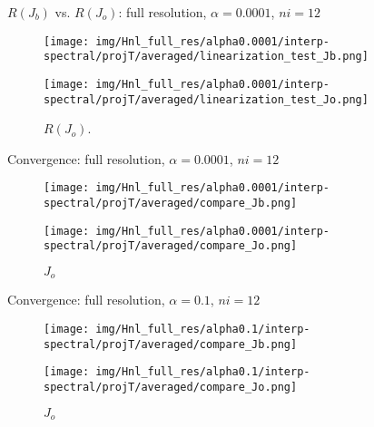 \documentclass[francais]{beamer}
\begin{document}
\begin{frame}{$R(J_b)$ vs. $R(J_o)$: full resolution, $\alpha = 0.0001$, $ni=12$}
\begin{center}
\begin{figure}
  \texttt{[image: img/Hnl\_full\_res/alpha0.0001/interp-spectral/projT/averaged/linearization\_test\_Jb.png]}
  \caption{$R(J_b)$.}
\endminipage\hfill
{}
  \texttt{[image: img/Hnl\_full\_res/alpha0.0001/interp-spectral/projT/averaged/linearization\_test\_Jo.png]}
  \caption{$R(J_o)$.}
\endminipage
\end{figure}
\end{center}
\end{frame}

\begin{frame}{Convergence: full resolution, $\alpha = 0.0001$, $ni=12$}
\begin{center}
\begin{figure}
  \texttt{[image: img/Hnl\_full\_res/alpha0.0001/interp-spectral/projT/averaged/compare\_Jb.png]}
  \caption{$J_b$}
\endminipage\hfill
{}
  \texttt{[image: img/Hnl\_full\_res/alpha0.0001/interp-spectral/projT/averaged/compare\_Jo.png]}
  \caption{$J_o$}
\endminipage
\end{figure}
\end{center}
\end{frame}

\begin{frame}{Convergence: full resolution, $\alpha = 0.1$, $ni=12$}
\begin{center}
\begin{figure}
  \texttt{[image: img/Hnl\_full\_res/alpha0.1/interp-spectral/projT/averaged/compare\_Jb.png]}
  \caption{$J_b$}
\endminipage\hfill
{}
  \texttt{[image: img/Hnl\_full\_res/alpha0.1/interp-spectral/projT/averaged/compare\_Jo.png]}
  \caption{$J_o$}
\endminipage
\end{figure}
\end{center}
\end{frame}
\end{document}
